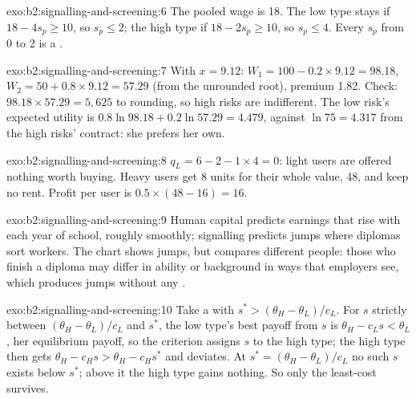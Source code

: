 \begin{solution}{exo:b2:signalling-and-screening:6}
The pooled wage is 18. The low type stays if $18 - 4s_p \ge 10$, so $s_p \le 2$; the high type if $18 - 2s_p \ge 10$, so $s_p \le 4$. Every $s_p$
from 0 to 2 is a .
\end{solution}

\begin{solution}{exo:b2:signalling-and-screening:7}
With $x = 9.12$: $W_1 = 100 - 0.2 \times 9.12 = 98.18$, $W_2 = 50 + 0.8 \times 9.12 = 57.29$ (from the unrounded root), premium 1.82. Check:
$98.18 \times 57.29 = 5{,}625$ to rounding, so high risks are indifferent. The low risk's expected utility is $0.8\ln 98.18 + 0.2\ln 57.29 =
4.479$, against $\ln 75 = 4.317$ from the high risks' contract: she prefers her own.
\end{solution}

\begin{solution}{exo:b2:signalling-and-screening:8}
$q_L = 6 - 2 - 1 \times 4 = 0$: light users are offered nothing worth buying. Heavy users get 8 units for their whole value, 48, and keep no
rent. Profit per user is $0.5 \times (48 - 16) = 16$.
\end{solution}

\begin{solution}{exo:b2:signalling-and-screening:9}
Human capital predicts earnings that rise with each year of school, roughly smoothly; signalling predicts jumps where
diplomas sort workers. The chart shows jumps, but compares different people: those who finish a diploma may differ in
ability or background in ways that employers see, which produces jumps without any .
\end{solution}

\begin{solution}{exo:b2:signalling-and-screening:10}
Take a  with $s^* > (\theta_H - \theta_L)/c_L$. For $s$ strictly between $(\theta_H - \theta_L)/c_L$ and $s^*$, the low type's best payoff from
$s$ is $\theta_H - c_L s < \theta_L$, her equilibrium payoff, so the criterion assigns $s$ to the high type; the high type then gets $\theta_H - c_H s >
\theta_H - c_H s^*$ and deviates. At $s^* = (\theta_H - \theta_L)/c_L$ no such $s$ exists below $s^*$; above it the high type gains nothing. So only the
least-cost  survives.
\end{solution}

